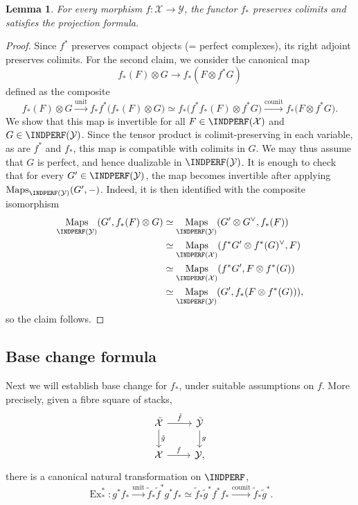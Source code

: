 \documentclass[12pt, oneside]{amsart}
\numberwithin{equation}{section}
\newtheorem{lemma}[subsubsection]{Lemma}
\theoremstyle{remark}
\theoremstyle{plain}
\DeclareMathOperator{\Map}{Maps}
\newcommand{\YY}{\mathcal{Y}}
\newcommand{\XX}{\mathcal{X}}
\begin{document}
\begin{lemma}\label{lem:indperf push easy}
For every morphism $f:\XX\rightarrow\YY$, the functor $f_*$ preserves colimits and satisfies the projection formula.
\end{lemma}
\begin{proof}
  Since $f^*$ preserves compact objects (= perfect complexes), its right adjoint preserves colimits.
  For the second claim, we consider the canonical map
  \[
    f_*(F) \otimes G \longrightarrow f_*(F \otimes f^*G)
  \]
  defined as the composite
  \[
    f_*(F) \otimes G
    \xrightarrow{\mathrm{unit}} f_*f^*\bigl(f_*(F) \otimes G\bigr)
    \simeq f_*\bigl(f^*f_*(F) \otimes f^*G\bigr)
    \xrightarrow{\mathrm{counit}} f_*\bigl(F \otimes f^*G\bigr).
  \]
  We show that this map is invertible for all $F \in \INDPERF(\XX)$ and $G \in \INDPERF(\YY)$.
  Since the tensor product is colimit-preserving in each variable, as are $f^*$ and $f_*$, this map is compatible with colimits in $G$.
  We may thus assume that $G$ is perfect, and hence dualizable in $\INDPERF(\YY)$.
  It is enough to check that for every $G' \in \INDPERF(\YY)$, the map becomes invertible after applying $\Map_{\INDPERF(\YY)}(G', -)$.
  Indeed, it is then identified with the composite isomorphism
  \begin{align*}
    \Map_{\INDPERF(\YY)}(G', f_*(F) \otimes G)
    &\simeq \Map_{\INDPERF(\YY)}(G' \otimes G^\vee, f_*(F)) \\
    &\simeq \Map_{\INDPERF(\XX)}(f^*G' \otimes f^*(G)^\vee, F) \\
    &\simeq \Map_{\INDPERF(\XX)}(f^*G', F \otimes f^*(G)) \\
    &\simeq \Map_{\INDPERF(\YY)}(G', f_*(F \otimes f^*(G))),
  \end{align*}
  so the claim follows.
\end{proof}

\subsection{Base change formula}

Next we will establish base change for $f_*$, under suitable assumptions on $f$.
More precisely, given a fibre square of stacks,
\begin{equation}\label{eq:indperf fibsq}
  \begin{tikzcd}
    \tilde{\XX} \arrow{d}{\tilde{g}}\arrow{r}{\tilde{f}} & \tilde{\YY}\arrow{d}{g} \\
    \XX\arrow{r}{f} & \YY,
  \end{tikzcd}
\end{equation}
there is a canonical natural transformation on $\INDPERF$,
\[
  \operatorname{Ex}^*_* : g^* f_*
  \xrightarrow{\mathrm{unit}} \tilde{f}_* \tilde{f}^* g^* f_*
  \simeq \tilde{f}_* \tilde{g}^* f^* f_*
  \xrightarrow{\mathrm{counit}} \tilde{f}_* \tilde{g}^*.
\]
\end{document}
